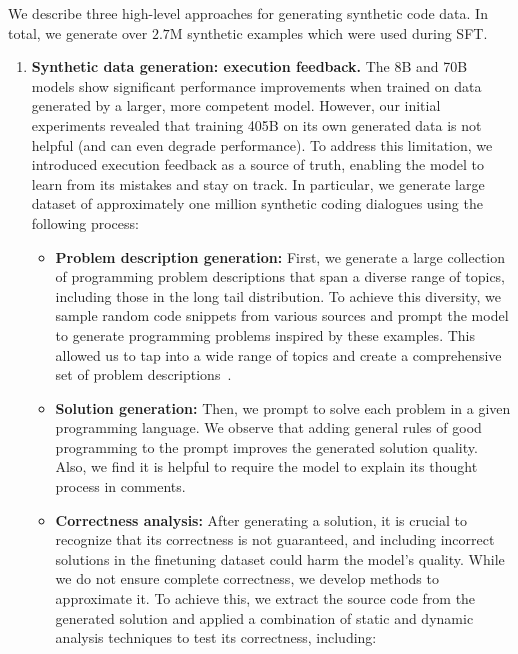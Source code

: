 \documentclass[dvipsnames]{fairmeta}
\begin{document}
We describe three high-level approaches for generating synthetic code data. In total, we generate over $2.7$M synthetic examples which were used during SFT.

\begin{enumerate}
    \item{\textbf{Synthetic data generation: execution feedback.}} The 8B and 70B models show significant performance improvements when trained on data generated by a larger, more competent model. However, our initial experiments revealed that training \llamathree 405B on its own generated data is not helpful (and can even degrade performance). To address this limitation, we introduced execution feedback as a source of truth, enabling the model to learn from its mistakes and stay on track. 
    In particular, we generate large dataset of approximately one million synthetic coding dialogues using the following process:

    \begin{itemize}
        \item \textbf{Problem description generation:}
        First, we generate a large collection of programming problem descriptions that span a diverse range of topics, including those in the long tail distribution. To achieve this diversity, we sample random code snippets from various sources and prompt the model to generate programming problems inspired by these examples. This allowed us to tap into a wide range of topics and create a comprehensive set of problem descriptions~\citep{wei2024magicoderempoweringcodegeneration}.
        
        \item \textbf{Solution generation:} Then, we prompt \llamathree to solve each problem in a given programming language. We observe that adding general rules of good programming to the prompt improves the generated solution quality. Also, we find it is helpful to require the model to explain its thought process in comments.
        
        \item \textbf{Correctness analysis:}
        After generating a solution, it is crucial to recognize that its correctness is not guaranteed, and including incorrect solutions in the finetuning dataset could harm the model's quality. While we do not ensure complete correctness, we develop methods to approximate it. To achieve this, we extract the source code from the generated solution and applied a combination of static and dynamic analysis techniques to test its correctness, including:
        

\end{itemize}
\end{enumerate}
\end{document}
